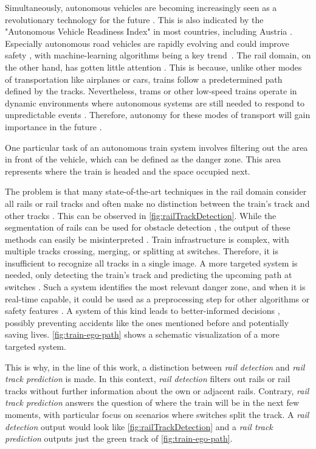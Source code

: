 \noindent Simultaneously, autonomous vehicles are becoming increasingly seen as a revolutionary technology for the future \cite{FraunhoferInstituteforCognitiveSystemsIKS}.
This is also indicated by the "Autonomous Vehicle Readiness Index" \cite{autonomousVehicleReadinessIndex} in most countries, including Austria \cite{autonomousVehicleReadinessCounties}.
Especially autonomous road vehicles are rapidly evolving and could improve safety \cite{railsem19dataset} \cite{tepNet2024}, with machine-learning algorithms being a key trend~\cite{railsem19dataset}.
The rail domain, on the other hand, has gotten little attention \cite{railsem19dataset}.
This is because, unlike other modes of transportation like airplanes or cars, trains follow a predetermined path defined by the tracks.
Nevertheless, trams or other low-speed trains operate in dynamic environments where autonomous systems are still needed to respond to unpredictable events \cite{tepNet2024}.
Therefore, autonomy for these modes of transport will gain importance in the future \cite{railNet2019}.

One particular task of an autonomous train system involves filtering out the area in front of the vehicle, which can be defined as the danger zone.
This area represents where the train is headed and the space occupied next.

The problem is that many state-of-the-art techniques in the rail domain consider all rails or rail tracks and often make no distinction between the train's track and other tracks \cite{tepNet2024}.
This can be observed in \autoref{fig:railTrackDetection}.
While the segmentation of rails can be used for obstacle detection \cite{railNet2019}, the output of these methods can easily be misinterpreted \cite{tepNet2024}.
Train infrastructure is complex, with multiple tracks crossing, merging, or splitting at switches. Therefore, it is insufficient to recognize all tracks in a single image.
A more targeted system is needed, only detecting the train's track and predicting the upcoming path at switches \cite{tepNet2024}.
Such a system identifies the most relevant danger zone, and when it is real-time capable, it could be used as a preprocessing step for other algorithms or safety features \cite{tepNet2024} \cite{railNet2019}.
A system of this kind leads to better-informed decisions \cite{tepNet2024}, possibly preventing accidents like the ones mentioned before and potentially saving lives.
\autoref{fig:train-ego-path} shows a schematic visualization of a more targeted system.

This is why, in the line of this work, a distinction between \textit{rail detection} and \textit{rail track prediction} is made.
In this context, \textit{rail detection} filters out rails or rail tracks without further information about the own or adjacent rails.
Contrary, \textit{rail track prediction} answers the question of where the train will be in the next few moments, with particular focus on scenarios where switches split the track.
A \textit{rail detection} output would look like \autoref{fig:railTrackDetection} and a \textit{rail track prediction} outputs just the green track of \autoref{fig:train-ego-path}.

